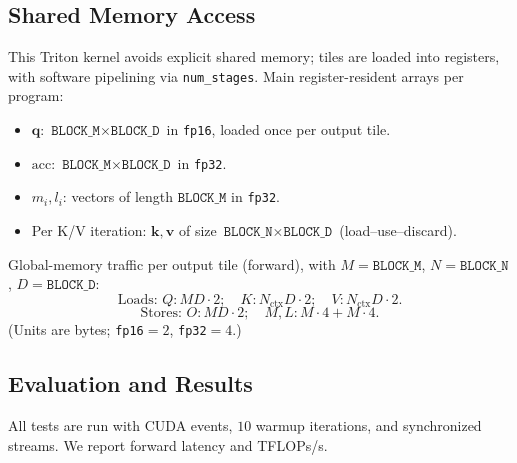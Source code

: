 \documentclass[11pt]{article}
\begin{document}
\subsection{Shared Memory Access}
\label{sec:mem-acc}

This Triton kernel avoids explicit shared memory; tiles are loaded into registers, with software pipelining via \texttt{num\_stages}. Main register-resident arrays per program:
\begin{itemize}
  \item $\mathbf{q}$: $\texttt{BLOCK\_M}\times \texttt{BLOCK\_D}$ in \texttt{fp16}, loaded once per output tile.
  \item $\mathrm{acc}$: $\texttt{BLOCK\_M}\times \texttt{BLOCK\_D}$ in \texttt{fp32}.
  \item $m_i, l_i$: vectors of length $\texttt{BLOCK\_M}$ in \texttt{fp32}.
  \item Per K/V iteration: $\mathbf{k},\mathbf{v}$ of size $\texttt{BLOCK\_N}\times \texttt{BLOCK\_D}$ (load--use--discard).
\end{itemize}
Global-memory traffic per output tile (forward), with $M=\texttt{BLOCK\_M}$, $N=\texttt{BLOCK\_N}$, $D=\texttt{BLOCK\_D}$:
\[
\text{Loads: }Q: M D\cdot 2;\quad K: N_{\mathrm{ctx}} D\cdot 2;\quad V: N_{\mathrm{ctx}} D\cdot 2.
\]
\[
\text{Stores: }O: M D\cdot 2;\quad M,L: M\cdot 4 + M\cdot 4.
\]
(Units are bytes; \texttt{fp16}$=2$, \texttt{fp32}$=4$.) 

\subsection{Evaluation and Results}

All tests are run with CUDA events, $10$ warmup iterations, and synchronized streams. We report forward  latency and TFLOPs/s.\vspace{2mm}
\end{document}
